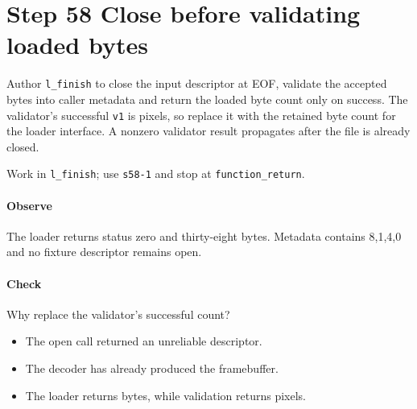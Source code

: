 \section{Step 58 Close before validating loaded bytes}\label{qoi-s58}
Author \texttt{l\_finish} to close the input descriptor at EOF, validate the accepted bytes into caller metadata and return the loaded byte count only on success. The validator’s successful \texttt{v1} is pixels, so replace it with the retained byte count for the loader interface. A nonzero validator result propagates after the file is already closed.

Work in \texttt{l\_finish}; use \texttt{s58-1} and stop at \texttt{function\_return}.

\paragraph{Observe} The loader returns status zero and thirty-eight bytes. Metadata contains 8,1,4,0 and no fixture descriptor remains open.

\paragraph{Check} Why replace the validator’s successful count?
\begin{itemize}
\item[A.] The open call returned an unreliable descriptor.
\item[B.] The decoder has already produced the framebuffer.
\item[C.] The loader returns bytes, while validation returns pixels.
\end{itemize}
